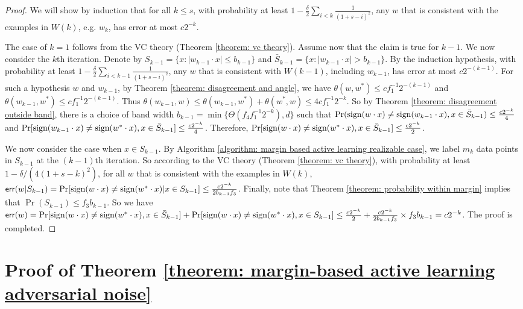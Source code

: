 \documentclass[11pt]{article}
\newcommand{\err}{\textup{\textsf{err}}}
\newcommand{\sign}{\textup{sign}}
\begin{document}
{{{{\medskip
\begin{proof}
We will show by induction that for all $k\le s$, with probability at least $1-\frac{\delta}{2}\sum_{i<k}\frac{1}{(1+s-i)^2}$, any $w$ that is consistent with the examples in $W(k)$, e.g. $w_k$, has error at most $c2^{-k}$.

The case of $k=1$ follows from the VC theory (Theorem \ref{theorem: vc theory}). Assume now that the claim is true for $k-1$. We now consider the $k$th iteration. Denote by $S_{k-1}=\{x: |w_{k-1}\cdot x|\le b_{k-1}\}$ and $\bar S_{k-1}=\{x: |w_{k-1}\cdot x|> b_{k-1}\}$. By the induction hypothesis, with probability at least $1-\frac{\delta}{2}\sum_{i<k-1}\frac{1}{(1+s-i)^2}$, any $w$ that is consistent with $W(k-1)$, including $w_{k-1}$, has error at most $c2^{-(k-1)}$. For such a hypothesis $w$ and $w_{k-1}$, by Theorem \ref{theorem: disagreement and angle}, we have $\theta(w,w^*)\le cf_1^{-1}2^{-(k-1)}$ and $\theta(w_{k-1},w^*)\le cf_1^{-1}2^{-(k-1)}$. Thus $\theta(w_{k-1},w)\le \theta(w_{k-1},w^*)+\theta(w^*,w)\le 4cf_1^{-1} 2^{-k}$. So by Theorem \ref{theorem: disagreement outside band}, there is a choice of band width $b_{k-1}=\min\{\Theta(f_4f_1^{-1}2^{-k}),d\}$ such that $\Pr(\sign(w\cdot x)\not=\sign(w_{k-1}\cdot x),x\in \bar S_{k-1})\le \frac{c2^{-k}}{4}$ and $\Pr[\sign(w_{k-1}\cdot x)\not=\sign(w^*\cdot x),x\in \bar S_{k-1}]\le \frac{c2^{-k}}{4}$. Therefore,
$\Pr[\sign(w\cdot x)\not=\sign(w^*\cdot x), x\in\bar S_{k-1}]\le \frac{c2^{-k}}{2}$.

We now consider the case when $x\in S_{k-1}$. By Algorithm \ref{algorithm: margin based active learning realizable case}, we label $m_k$ data points in $S_{k-1}$ at the $(k-1)$th iteration. So according to the VC theory (Theorem \ref{theorem: vc theory}), with probability at least $1-\delta/(4(1+s-k)^2)$, for all $w$ that is consistent with the examples in $W(k)$,
$
\err(w|S_{k-1})=\Pr[\sign(w\cdot x)\not=\sign(w^*\cdot x)|x\in S_{k-1}]\le \frac{c2^{-k}}{2b_{k-1}f_3}
$.
Finally, note that Theorem \ref{theorem: probability within margin} implies that $\Pr(S_{k-1})\le f_3b_{k-1}$. So we have
$\err(w)=\Pr[\sign(w\cdot x)\not=\sign(w^*\cdot x), x\in\bar S_{k-1}]+\Pr[\sign(w\cdot x)\not=\sign(w^*\cdot x), x\in S_{k-1}]\le \frac{c2^{-k}}{2}+\frac{c2^{-k}}{2b_{k-1}f_3}\times f_3b_{k-1}=c2^{-k}$.
The proof is completed.
\end{proof}


\section{Proof of Theorem \ref{theorem: margin-based active learning adversarial noise}}
\label{appendix: adversarial noise induction}

}}}}
\end{document}
